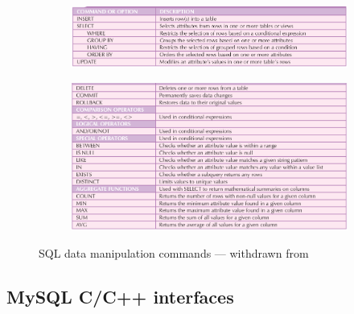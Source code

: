 \begin{figure}[htb!]
  \centering
  \begin{subfigure}[t]{.9\textwidth}
  \includegraphics[width=\textwidth]{img/sql-dml-1.png}%
\end{subfigure}
%
%
  \begin{subfigure}{.9\textwidth}
  \includegraphics[width=\textwidth]{img/sql-dml-2.png}%
\end{subfigure}
  \caption{SQL data manipulation commands --- withdrawn from~\cite{coronel2016database}}%
  \label{fig:sql-dml}
\end{figure}
%


\subsection{MySQL C/C++ interfaces}
\label{sec:sql-c++-interface}





